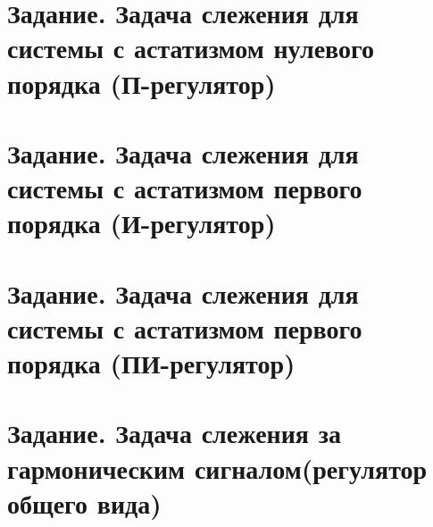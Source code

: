 \documentclass[a5paper, 10pt]{article}
\theoremstyle{definition}
\theoremstyle{plain}
\theoremstyle{remark}
\begin{document}
\section{Задание. Задача слежения для системы с астатизмом нулевого порядка (П-регулятор)}
\section{Задание. Задача слежения для системы с астатизмом первого порядка (И-регулятор)}
\section{Задание. Задача слежения для системы с астатизмом первого порядка (ПИ-регулятор)}
\section{Задание. Задача слежения за гармоническим сигналом(регулятор общего вида)}
\end{document}
